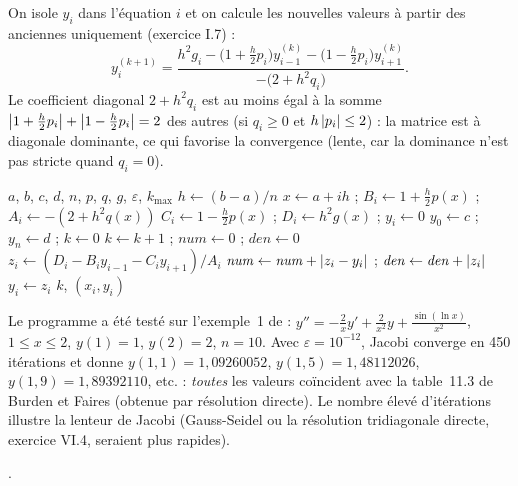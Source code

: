 On isole $y_i$ dans l'équation $i$ et on calcule les nouvelles valeurs à partir
des anciennes uniquement (exercice I.7) :
\[
  y_i^{(k+1)} = \frac{h^2g_i - \bigl(1 + \frac h2p_i\bigr)y_{i-1}^{(k)}
                - \bigl(1 - \frac h2p_i\bigr)y_{i+1}^{(k)}}{-\bigl(2 + h^2q_i\bigr)} .
\]
Le coefficient diagonal $2 + h^2q_i$ est au moins égal à la somme
$\left|1 + \frac h2p_i\right| + \left|1 - \frac h2p_i\right| = 2$ des autres (si $q_i \ge 0$
et $h\left|p_i\right| \le 2$) : la matrice est à diagonale dominante, ce qui favorise
la convergence (lente, car la dominance n'est pas stricte quand $q_i = 0$).

\begin{algo}
  \Require $a$, $b$, $c$, $d$, $n$, $p$, $q$, $g$, $\varepsilon$, $k_{\max}$
  \State $h \leftarrow (b-a)/n$
    \State $x \leftarrow a + ih$ ; $B_i \leftarrow 1 + \frac h2p(x)$ ; $A_i \leftarrow -(2 + h^2q(x))$
    \State $C_i \leftarrow 1 - \frac h2p(x)$ ; $D_i \leftarrow h^2g(x)$ ; $y_i \leftarrow 0$
  \EndFor
  \State $y_0 \leftarrow c$ ; $y_n \leftarrow d$ ; $k \leftarrow 0$
  \Repeat
    \State $k \leftarrow k + 1$ ; $\mathit{num} \leftarrow 0$ ; $\mathit{den} \leftarrow 0$
      \State $z_i \leftarrow (D_i - B_iy_{i-1} - C_iy_{i+1})/A_i$
      \State $\mathit{num} \leftarrow \mathit{num} + \left|z_i - y_i\right|$ ; $\mathit{den} \leftarrow \mathit{den} + \left|z_i\right|$
    \EndFor
     \State $y_i \leftarrow z_i$ \EndFor
  \Print $k$, $(x_i, y_i)$
\end{algo}


\Verif Le programme a été testé sur l'exemple~1 de  :
$y'' = -\frac2xy' + \frac2{x^2}y + \frac{\sin(\ln x)}{x^2}$, $1 \le x \le 2$,
$y(1) = 1$, $y(2) = 2$, $n = 10$. Avec $\varepsilon = 10^{-12}$, Jacobi converge
en 450 itérations et donne $y(1{,}1) = 1{,}09260052$, $y(1{,}5) = 1{,}48112026$,
$y(1{,}9) = 1{,}89392110$, etc. : \emph{toutes} les valeurs coïncident avec la
table~11.3 de Burden et Faires (obtenue par résolution directe). Le nombre élevé
d'itérations illustre la lenteur de Jacobi (Gauss-Seidel ou la résolution
tridiagonale directe, exercice VI.4, seraient plus rapides).

\Refs {}.

